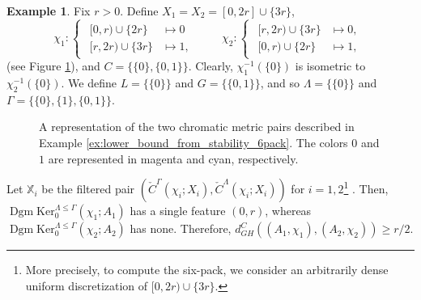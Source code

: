 \documentclass[8pt,a4paper,oneside,english,english]{article}
\theoremstyle{plain}
\theoremstyle
{plain}
\theoremstyle{definition}
\newtheorem{example}[theorem]{Example}%
\newcommand{\GH}{d_{GH}}
\newcommand{\MP}[1]{(A_{#1},\chi_{#1})}
\newcommand{\sixPackPersistenceModule}[6]{{#6}_{#5}^{{#3}\leq{#4}}({#2};{#1})}
\newcommand{\Ker}[5]{\sixPackPersistenceModule{#1}{#2}{#3}{#4}{#5}{\mathrm{Ker}}}
\DeclareMathOperator{\Dgm}{Dgm}
\begin{document}
\begin{example}
    Fix $r>0$. Define $X_1=X_2=[0,2r]\cup\{3r\}$,
    \[
    \chi_1\colon\begin{cases}\begin{aligned}
        [0,r)\cup\{2r\} &\mapsto 0\\
        [r,2r)\cup\{3r\} &\mapsto 1,
    \end{aligned}\end{cases}\quad\quad \chi_2\colon\begin{cases}\begin{aligned}
        [r,2r)\cup\{3r\} &\mapsto 0,\\
        [0,r)\cup\{2r\} &\mapsto 1,
        \end{aligned}\end{cases}
    \]
    (see Figure \ref{fig:lower_bound_from_stability_6pack_dim0}), and $C=\{\{0\},\{0,1\}\}$.  Clearly, $\chi_1^{-1}(\{0\})$ is isometric to $\chi_2^{-1}(\{0\})$. We define $L=\{\{0\}\}$ and $G=\{\{0,1\}\}$, and so $\Lambda=\{\{0\}\}$ and $\Gamma=\{\{0\},\{1\},\{0,1\}\}$.
        \begin{figure}[h!]
        \centering
        \caption{\footnotesize A representation of the two chromatic metric pairs described in Example \ref{ex:lower_bound_from_stability_6pack}. The colors $0$ and $1$ are represented in magenta and cyan, respectively.}
        \label{fig:lower_bound_from_stability_6pack_dim0}
    \end{figure}
    Let $\mathbb X_i$ be the filtered pair $(\check{C}^\Gamma(\chi_i;X_i),\check{C}^\Lambda(\chi_i;X_i))$ for $i=1,2$\footnote{
    More precisely, to compute the six-pack, we consider an arbitrarily dense uniform discretization of $[0,2r)\cup\{3r\}$.}
    . Then, $\Dgm\Ker{A_1}{\chi_1}{\Lambda}{\Gamma}{0}$ has a single feature $(0,r)$, whereas $\Dgm\Ker{A_2}{\chi_2}{\Lambda}{\Gamma}{0}$ has none. Therefore, $\GH^C(\MP{1},\MP{2})\geq r/2$.


\end{example}
\end{document}
